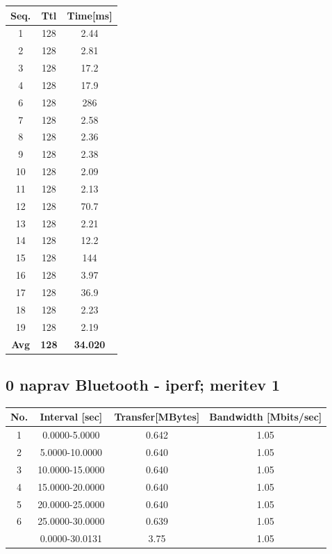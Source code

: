 \documentclass[11pt,a4paper,slovene]{article}
\begin{document}
 
\begin{table}[H]
	\begin{adjustwidth}{-3cm}{-3cm}
	\centering
		\begin{tabular}{c|c|c}
		\hline
		\textbf{Seq.} & \textbf{Ttl} & \textbf{Time[ms]}\\
     		\hline
     		1 & 128 & 2.44\\
  		2 & 128 & 2.81\\
  		3 & 128 & 17.2\\
  		4 & 128 & 17.9\\
  		6 & 128 & 286\\
  		7 & 128 & 2.58\\
  		8 & 128 & 2.36\\
  		9 & 128 & 2.38\\
  		10 & 128 & 2.09\\
  		11 & 128 & 2.13\\
  		12 & 128 & 70.7\\
  		13 & 128 & 2.21\\
  		14 & 128 & 12.2\\
  		15 & 128 & 144\\
  		16 & 128 & 3.97\\
  		17 & 128 & 36.9\\
  		18 & 128 & 2.23\\
  		19 & 128 & 2.19\\
  		\hline
  		\textbf{Avg} & \textbf{128} & \textbf{34.020}\\
  		\hline
  		\end{tabular}
    	\end{adjustwidth}
\end{table}

\subsection{0 naprav Bluetooth - iperf; meritev 1}

\begin{table}[H]
	\begin{adjustwidth}{-3cm}{-3cm}
	\centering
		\begin{tabular}{c|c|c|c}
		\hline
		\textbf{No.} & \textbf{Interval [sec]} & \textbf{Transfer[MBytes]} & \textbf{Bandwidth [Mbits/sec]}\\
     		\hline
     		1 & 0.0000-5.0000 & 0.642 & 1.05\\
  		2 & 5.0000-10.0000 & 0.640 & 1.05\\
  		3 & 10.0000-15.0000 & 0.640 & 1.05\\
  		4 & 15.0000-20.0000 & 0.640 & 1.05\\
  		5 & 20.0000-25.0000 & 0.640 & 1.05\\
  		6 & 25.0000-30.0000 & 0.639 & 1.05\\
  		\hline
  		& 0.0000-30.0131 & 3.75 & 1.05\\
  		\hline
    		\end{tabular}
    	\end{adjustwidth}
\end{table}
\end{document}
